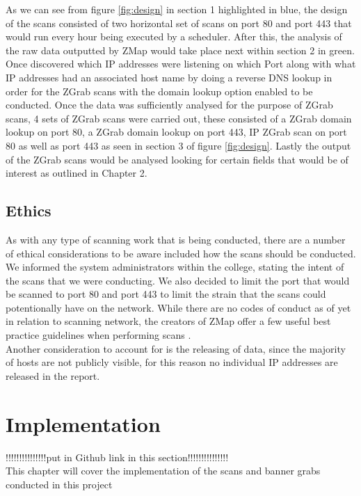 \documentclass[a4wide,leqno,12pt]{report}
\begin{document}
As we can see from figure \ref{fig:design} in section 1 highlighted in blue,
the design of the scans consisted of two horizontal set of scans on port 80 and port 443 that would run every hour being executed by a scheduler. After this, the analysis of the raw data outputted by ZMap would take place next within section 2 in green. Once discovered which IP addresses were listening on which Port along with what IP addresses had an associated host name by doing a reverse DNS lookup in order for the ZGrab scans with the domain lookup option enabled to be conducted. Once the data was sufficiently analysed for the purpose of ZGrab scans, 4 sets of ZGrab scans were carried out, these consisted of a ZGrab domain lookup on port 80, a ZGrab domain lookup on port 443, IP ZGrab scan on port 80 as well as port 443 as seen in section 3 of figure \ref{fig:design}. Lastly the output of the ZGrab scans would be analysed looking for certain fields that would be of interest as outlined in Chapter 2.

\section{Ethics}
As with any type of scanning work that is being conducted, there are a number of ethical considerations to be aware included how the scans should be conducted. We informed the system administrators within the college, stating the intent of the scans that we were conducting. We also decided to limit the port that would be scanned to port 80 and port 443 to limit the strain that the scans could potentionally have on the network. While there are no codes of conduct as of yet in relation to scanning network, the creators of ZMap offer a few useful best practice guidelines when performing scans\cite{durumeric2015search}  \cite{durumeric2013zmap}.\\

Another consideration to account for is the releasing of data, since the majority of hosts are not publicly visible, for this reason no individual IP addresses are released in the report.
\chapter{Implementation}

!!!!!!!!!!!!!!!put in Github link in this section!!!!!!!!!!!!!!!\\

This chapter will cover the implementation of the scans and banner grabs conducted in this project
\end{document}
